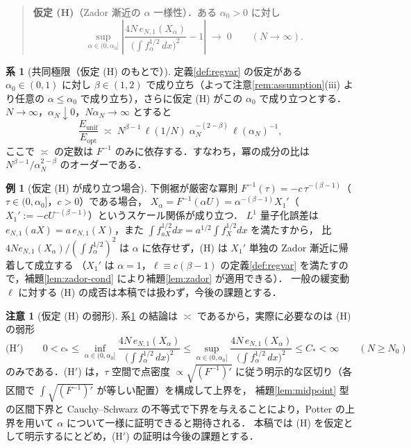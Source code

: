 \documentclass[a4paper,10pt]{jsarticle}
\theoremstyle{definition}
\newtheorem{corollary}{系}[section]
\newtheorem{remark}{注意}[section]
\newtheorem{example}{例}[section]
\newcommand{\Finv}{F^{-1}}
\newcommand{\eN}{e_{N,1}}
\newcommand{\Eunif}{E_{\mathrm{unif}}}
\newcommand{\Eopt}{E_{\mathrm{opt}}}
\begin{document}
\begin{quote}
\textbf{仮定 (H)}（Zador 漸近の $\alpha$ 一様性）．ある $\alpha_0>0$ に対し
\begin{equation*}
  \sup_{\alpha\in(0,\alpha_0]}\left|\frac{4N\,\eN(X_\alpha)}{\bigl(\int f_\alpha^{1/2}\,dx\bigr)^{2}}-1\right|\;\longrightarrow\;0\qquad(N\to\infty).
\end{equation*}
\end{quote}

\begin{corollary}[共同極限（仮定 (H) のもとで）]
\label{cor:joint}
定義\ref{def:regvar} の仮定がある $\alpha_0\in(0,1)$ に対し $\beta\in(1,2)$ で成り立ち（よって注意\ref{rem:assumption}(iii) より任意の $\alpha\le\alpha_0$ で成り立ち），さらに仮定 (H) がこの $\alpha_0$ で成り立つとする．
$N\to\infty$，$\alpha_N\downarrow0$，$N\alpha_N\to\infty$ とすると
\begin{equation}
  \frac{\Eunif}{\Eopt}
  \;\asymp\;N^{\beta-1}\,\ell(1/N)\;\alpha_N^{-(2-\beta)}\,\ell(\alpha_N)^{-1},
  \label{eq:conj-scaling2}
\end{equation}
ここで $\asymp$ の定数は $\Finv$ のみに依存する．すなわち，冪の成分の比は $N^{\beta-1}/\alpha_N^{2-\beta}$ のオーダーである．
\end{corollary}

\begin{example}[仮定 (H) が成り立つ場合]
\label{ex:powertail}
下側裾が厳密な冪則 $\Finv(\tau)=-c\,\tau^{-(\beta-1)}$（$\tau\in(0,\alpha_0]$，$c>0$）である場合，
$X_\alpha=\Finv(\alpha U)=\alpha^{-(\beta-1)}X_1'$（$X_1':=-cU^{-(\beta-1)}$）というスケール関係が成り立つ．
$L^1$ 量子化誤差は $\eN(aX)=a\,\eN(X)$，また $\int f_{aX}^{1/2}dx=a^{1/2}\int f_X^{1/2}dx$ を満たすから，
比 $4N\eN(X_\alpha)/(\int f_\alpha^{1/2})^2$ は $\alpha$ に依存せず，(H) は $X_1'$ 単独の Zador 漸近に帰着して成立する
（$X_1'$ は $\alpha=1$，$\ell\equiv c(\beta-1)$ の定義\ref{def:regvar} を満たすので，補題\ref{lem:zador-cond} により補題\ref{lem:zador} が適用できる）．
一般の緩変動 $\ell$ に対する (H) の成否は本稿では扱わず，今後の課題とする．
\end{example}

\begin{remark}[仮定 (H) の弱形]
\label{rem:weakH}
系\ref{cor:joint} の結論は $\asymp$ であるから，実際に必要なのは (H) の弱形
\begin{equation*}
 \text{(H$'$)}\qquad
 0<c_\ast\le\inf_{\alpha\in(0,\alpha_0]}\frac{4N\,\eN(X_\alpha)}{\bigl(\int f_\alpha^{1/2}\,dx\bigr)^{2}}
 \le\sup_{\alpha\in(0,\alpha_0]}\frac{4N\,\eN(X_\alpha)}{\bigl(\int f_\alpha^{1/2}\,dx\bigr)^{2}}\le C_\ast<\infty
 \qquad(N\ge N_0)
\end{equation*}
のみである．(H$'$) は，$\tau$ 空間で点密度 $\propto\sqrt{(\Finv)'}$ に従う明示的な区切り（各区間で $\int\sqrt{(\Finv)'}$ が等しい配置）を構成して上界を，
補題\ref{lem:midpoint} 型の区間下界と Cauchy--Schwarz の不等式で下界を与えることにより，Potter の上界を用いて $\alpha$ について一様に証明できると期待される．
本稿では (H) を仮定として明示するにとどめ，(H$'$) の証明は今後の課題とする．
\end{remark}
\end{document}
